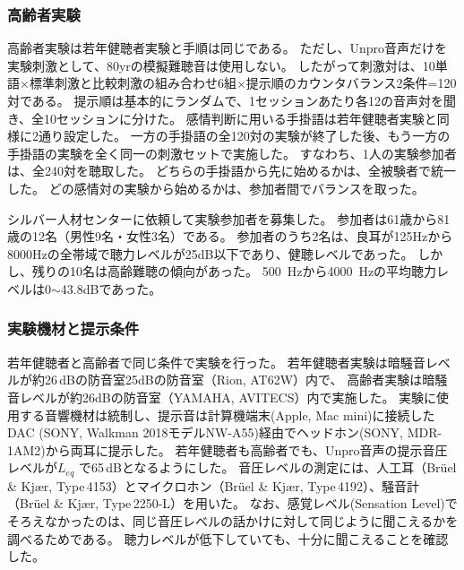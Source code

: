 \subsubsection{高齢者実験}

高齢者実験は若年健聴者実験と手順は同じである。
ただし、Unpro音声だけを実験刺激として、80yrの模擬難聴音は使用しない。
したがって刺激対は、10単語$\times$標準刺激と比較刺激の組み合わせ6組$\times$提示順のカウンタバランス2条件=120対である。
提示順は基本的にランダムで、1セッションあたり各12の音声対を聞き、全10セッションに分けた。
感情判断に用いる手掛語は若年健聴者実験と同様に2通り設定した。
一方の手掛語の全120対の実験が終了した後、もう一方の手掛語の実験を全く同一の刺激セットで実施した。
すなわち、1人の実験参加者は、全240対を聴取した。
どちらの手掛語から先に始めるかは、全被験者で統一した。
どの感情対の実験から始めるかは、参加者間でバランスを取った。

シルバー人材センターに依頼して実験参加者を募集した。
参加者は61歳から81歳の12名（男性9名・女性3名）である。
参加者のうち2名は、良耳が125Hzから8000Hzの全帯域で聴力レベルが25dB以下であり、健聴レベルであった。
しかし、残りの10名は高齢難聴の傾向があった。
500~Hzから4000~Hzの平均聴力レベルは0$\sim$43.8dBであった。


\subsubsection{実験機材と提示条件}
若年健聴者と高齢者で同じ条件で実験を行った。
若年健聴者実験は暗騒音レベルが約26\,dBの防音室25dBの防音室（Rion, AT62W）内で、
高齢者実験は暗騒音レベルが約26dBの防音室（YAMAHA, AVITECS）内で実施した。
実験に使用する音響機材は統制し、提示音は計算機端末(Apple, Mac mini)に接続したDAC (SONY, Walkman 2018モデルNW-A55)経由でヘッドホン(SONY, MDR-1AM2)から両耳に提示した。
若年健聴者も高齢者でも、Unpro音声の提示音圧レベルが${L_{eq}}$ で65\,dBとなるようにした。
音圧レベルの測定には、人工耳（Br\"{u}el \& Kj\ae r, Type\,4153）とマイクロホン（Br\"{u}el \& Kj\ae r, Type\,4192）、騒音計（Br\"{u}el \& Kj\ae r, Type\,2250-L）を用いた。
なお、感覚レベル(Sensation Level)でそろえなかったのは、同じ音圧レベルの話かけに対して同じように聞こえるかを調べるためである。
聴力レベルが低下していても、十分に聞こえることを確認した。



